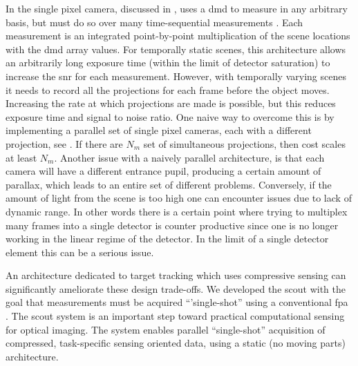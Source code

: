 In the single pixel camera, discussed in , uses a \gls{dmd} to measure in any arbitrary basis, but must do so over many time-sequential measurements \cite{duarte2008single}. Each measurement is an integrated point-by-point multiplication of the scene locations with the \gls{dmd} array values. For temporally static scenes, this architecture allows an arbitrarily long exposure time (within the limit of detector saturation) to increase the \gls{snr} for each measurement. However, with temporally varying scenes it needs to record all the projections for each frame before the object moves.  Increasing the rate at which projections are made is possible, but this reduces exposure time and signal to noise ratio. One naive way to overcome this is by implementing a parallel set of single pixel cameras, each with a different projection, see . If there are $N_m$ set of simultaneous projections, then cost scales at least $N_m$. Another issue with a naively parallel architecture, is that each camera will have a different entrance pupil, producing a certain amount of parallax, which leads to an entire set of different problems. Conversely, if the amount of light from the scene is too high one can encounter issues due to lack of dynamic range. In other words there is a certain point where trying to multiplex many frames into a single detector is counter productive since one is no longer working in the linear regime of the detector. In the limit of a single detector element this can be a serious issue.

An architecture dedicated to target tracking which uses \gls{compressive sensing} can significantly ameliorate these design trade-offs. We developed the \acrfull{scout} with the goal that measurements must be acquired ``'single-shot'' using a conventional \gls{fpa} \cite{townsend2012static, poon2012advances}. The \gls{scout} system is an important step toward practical computational sensing for optical imaging. The system enables parallel ``single-shot'' acquisition of compressed, task-specific sensing oriented data, using a static (no moving parts) architecture.

